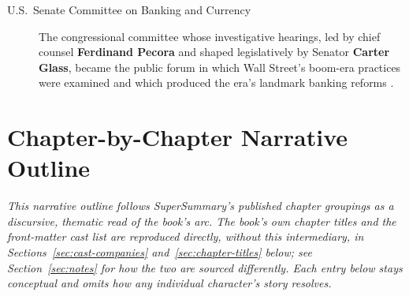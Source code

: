 \documentclass[11pt]{article}
\newcommand{\charname}[1]{\textbf{#1}}
\begin{document}
\begin{description}
\item[U.S.\ Senate Committee on Banking and Currency] The congressional
committee whose investigative hearings, led by chief counsel
\charname{Ferdinand Pecora} and shaped legislatively by Senator
\charname{Carter Glass}, became the public forum in which Wall Street's
boom-era practices were examined and which produced the era's landmark
banking reforms \autocite{libraryjournal1929,dailyeconomy1929}.

\end{description}

\section{Chapter-by-Chapter Narrative Outline}
\label{sec:narrative-outline}

\emph{This narrative outline follows SuperSummary's published chapter groupings
as a discursive, thematic read of the book's arc. The book's own chapter titles
and the front-matter cast list are reproduced directly, without this
intermediary, in Sections~\ref{sec:cast-companies} and~\ref{sec:chapter-titles}
below; see Section~\ref{sec:notes} for how the two are sourced differently. Each
entry below stays conceptual and omits how any individual character's story
resolves.}
\end{document}
